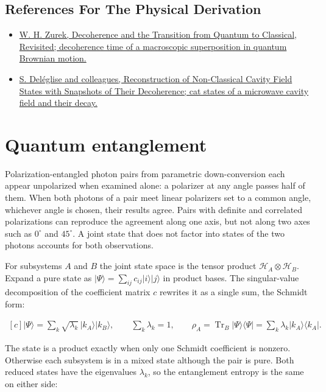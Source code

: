 \documentclass[11pt,oneside]{book}
\newenvironment{centeredalign}{\[\begin{gathered}[c]}{\end{gathered}\]}
\newcommand{\ket}[1]{\lvert #1\rangle}
\newcommand{\bra}[1]{\langle #1\rvert}
\begin{document}
\subsection*{References For The Physical Derivation}
\begin{itemize}
\item \href{https://arxiv.org/abs/quant-ph/0306072}{W. H. Zurek, Decoherence and the Transition from Quantum to Classical, Revisited; decoherence time of a macroscopic superposition in quantum Brownian motion.}
\item \href{https://arxiv.org/abs/0809.1064}{S. Deléglise and colleagues, Reconstruction of Non-Classical Cavity Field States with Snapshots of Their Decoherence; cat states of a microwave cavity field and their decay.}
\end{itemize}





\clearpage

\section{Quantum entanglement}

\label{topic:quantum-entanglement}

Polarization-entangled photon pairs from parametric down-conversion each appear unpolarized when examined alone: a polarizer at any angle passes half of them. When both photons of a pair meet linear polarizers set to a common angle, whichever angle is chosen, their results agree. Pairs with definite and correlated polarizations can reproduce the agreement along one axis, but not along two axes such as \(0^\circ\) and \(45^\circ\). A joint state that does not factor into states of the two photons accounts for both observations.

For subsystems \(A\) and \(B\) the joint state space is the tensor product \(\mathcal H_A\otimes\mathcal H_B\). Expand a pure state as \(\ket\Psi=\sum_{ij}c_{ij}\ket{i}\ket{j}\) in product bases. The singular-value decomposition of the coefficient matrix \(c\) rewrites it as a single sum, the Schmidt form:

\begin{centeredalign}
\ket\Psi=\sum_k\sqrt{\lambda_k}\,\ket{k_A}\ket{k_B},\qquad \sum_k\lambda_k=1,\qquad
\rho_A=\operatorname{Tr}_B\ket\Psi\bra\Psi=\sum_k\lambda_k\ket{k_A}\bra{k_A}.
\end{centeredalign}

The state is a product exactly when only one Schmidt coefficient is nonzero. Otherwise each subsystem is in a mixed state although the pair is pure. Both reduced states have the eigenvalues \(\lambda_k\), so the entanglement entropy is the same on either side:
\end{document}
